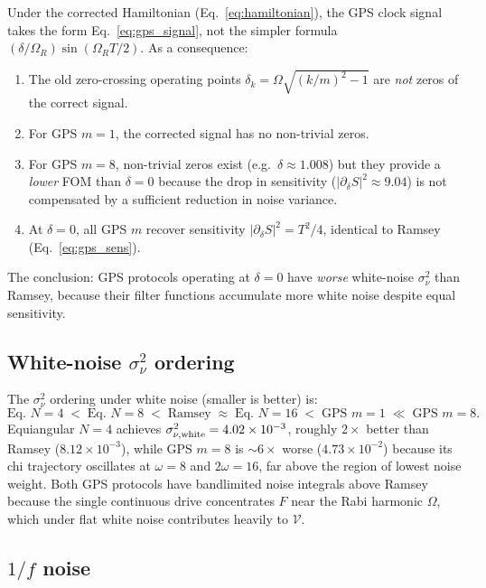 \documentclass[12pt]{article}
\begin{document}
Under the corrected Hamiltonian (Eq.~\eqref{eq:hamiltonian}), the GPS clock
signal takes the form Eq.~\eqref{eq:gps_signal}, not the simpler formula
$(\delta/\Omega_R)\sin(\Omega_R T/2)$.  As a consequence:
\begin{enumerate}
    \item The old zero-crossing operating points $\delta_k = \Omega\sqrt{(k/m)^2 - 1}$
          are \emph{not} zeros of the correct signal.
    \item For GPS $m=1$, the corrected signal has no non-trivial zeros.
    \item For GPS $m=8$, non-trivial zeros exist (e.g.\ $\delta \approx 1.008$) but
          they provide a \emph{lower} FOM than $\delta = 0$ because the drop in
          sensitivity ($|\partial_\delta S|^2 \approx 9.04$) is not compensated
          by a sufficient reduction in noise variance.
    \item At $\delta = 0$, all GPS $m$ recover sensitivity $|\partial_\delta S|^2 = T^2/4$,
          identical to Ramsey (Eq.~\eqref{eq:gps_sens}).
\end{enumerate}
The conclusion: GPS protocols operating at $\delta = 0$ have
\emph{worse} white-noise $\sigma^2_\nu$ than Ramsey, because their filter
functions accumulate more white noise despite equal sensitivity.

\subsection*{White-noise $\sigma^2_\nu$ ordering}

The $\sigma^2_\nu$ ordering under white noise (smaller is better) is:
\[
  \text{Eq. } N{=}4 \;<\; \text{Eq. } N{=}8 \;<\; \text{Ramsey}
  \;\approx\; \text{Eq. } N{=}16 \;<\; \text{GPS }m{=}1 \;\ll\; \text{GPS }m{=}8.
\]
Equiangular $N{=}4$ achieves $\sigma^2_{\nu,\rm white} = 4.02\times10^{-3}$, roughly
$2\times$ better than Ramsey ($8.12\times10^{-3}$), while GPS $m{=}8$ is
$\sim\!6\times$ worse ($4.73\times10^{-2}$) because its chi trajectory oscillates
at $\omega = 8$ and $2\omega = 16$, far above the region of lowest noise weight.
Both GPS protocols have bandlimited noise integrals above Ramsey because the
single continuous drive concentrates $F$ near the Rabi harmonic $\Omega$, which
under flat white noise contributes heavily to $\mathcal{V}$.

\subsection*{$1/f$ noise}
\end{document}
